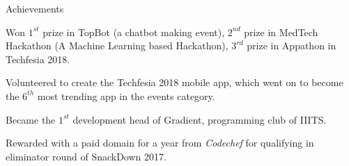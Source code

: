 \documentclass{resume} %
\newcommand{\tab}[1]{\hspace{.2667\textwidth}\rlap{#1}}
\newcommand{\itab}[1]{\hspace{0em}\rlap{#1}}
\begin{document}
\begin{rSection}{Achievements} \itemsep -2pt
\item Won $1^{st}$ prize in TopBot (a chatbot making event), $2^{nd}$ prize in MedTech Hackathon (A Machine Learning based Hackathon), $3^{rd}$ prize in Appathon in Techfesia 2018.
\item Volunteered to create the Techfesia 2018 mobile app, which went on to become the $6^{th}$ most trending app in the events category.
\item Became the $1^{st}$ development head of Gradient, programming club of IIITS.  
\item Rewarded with a paid domain for a year from \textit{Codechef} for qualifying in eliminator round of SnackDown
2017.
\end{rSection}

\end{document}
